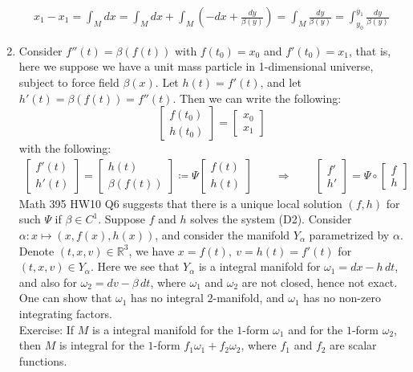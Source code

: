 \documentclass[15pt]{book}
\theoremstyle{break}
\theoremstyle{break}
\newcommand{\R}{\mathbb{R}}
\newcommand{\bmat}[1]{\begin{bmatrix} #1 \end{bmatrix}}
\newcommand{\exercise}{\color{green}Exercise: \color{black}}
\begin{document}
\begin{enumerate}
\begin{center}
\end{center}
\begin{align*}
x_1 - x_1 = \int_M dx = \int_M dx + \int_M \left( -dx + \frac{dy}{\beta(y)}\right) = \int_M \frac{dy}{\beta(y)} = \int_{y_0}^{y_1}\frac{dy}{\beta(y)}
\end{align*}
\item Consider $f''(t) = \beta(f(t))$ with $f(t_0) = x_0$ and $f'(t_0) = x_1$, that is, here we suppose we have a unit mass particle in 1-dimensional universe, subject to force field $\beta (x)$. Let $h(t) = f'(t)$, and let $h'(t) = \beta(f(t)) = f''(t)$. Then we can write the following:
$$ \bmat{f(t_0)\\ h(t_0)} = \bmat{x_0\\x_1}$$
with the following:
\begin{align*}
\bmat{f'(t) \\ h'(t)} = \bmat{h(t) \\ \beta(f(t))} \coloneqq \Psi\bmat{f(t) \\ h(t)} \qquad\Rightarrow \qquad \bmat{f'\\ h'} = \Psi \circ \bmat{f \\ h} \tag{D2}
\end{align*}
Math 395 HW10 Q6 suggests that there is a unique local solution $(f,h)$ for such $\Psi$ if $\beta\in C^1$. Suppose $f$ and $h$ solves the system (D2). Consider $\alpha: x\mapsto (x, f(x), h(x))$, and consider the manifold $Y_\alpha$ parametrized by $\alpha$. Denote $(t,x,v) \in \R^3$, we have $x= f(t), \ v=h(t) = f'(t)$ for $(t,x,v) \in Y_{\alpha}$. Here we see that $Y_\alpha$ is a integral manifold for $\omega_1 = dx - h\,dt$, and also for $\omega_2 = dv -\beta\, dt$, where $\omega_1$ and $\omega_2$ are not closed, hence not exact. One can show that $\omega_1$ has no integral $2$-manifold, and $\omega_1$ has no non-zero integrating factors. \\

\exercise If $M$ is a integral manifold for the $1$-form $\omega_1$ and for the $1$-form $\omega_2$, then $M$ is integral for the $1$-form $f_1 \omega_1 + f_2 \omega_2$, where $f_1$ and $f_2$ are scalar functions.  \\


\end{enumerate}
\end{document}
